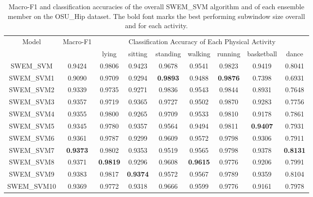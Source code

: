 \documentclass[letterpaper]{article}
\begin{document}
\begin{table*}[!htpb]
\small
\centering
\begin{tabular}{|c|c|c|c|c|c|c|c|c|}  \hline
\multicolumn{1}{|c|}{\multirow{2}{*}{Model}} & 
\multicolumn{1}{|c|}{\multirow{2}{*}{Macro-F1}} &
\multicolumn{7}{|c|}{Classification Accuracy of Each Physical Activity} \\ \cline{3-9}
         &       & lying      & sitting    & standing   & walking    & running    & basketball & dance \\ \hline
SWEM\_SVM & 0.9424   & 0.9806     & 0.9423     & 0.9678     & 0.9541     & 0.9823     & 0.9419     & 0.8041 \\ \hline
SWEM\_SVM1 & 0.9090   & 0.9709     & 0.9294     & {\bf 0.9893} & 0.9488     & {\bf 0.9876} & 0.7398     & 0.6931 \\ 
SWEM\_SVM2 & 0.9339   & 0.9735     & 0.9271     & 0.9836     & 0.9543     & 0.9844     & 0.8931     & 0.7648 \\ 
SWEM\_SVM3 & 0.9357   & 0.9719     & 0.9365     & 0.9727     & 0.9502     & 0.9870     & 0.9283     & 0.7756 \\ 
SWEM\_SVM4 & 0.9355   & 0.9800     & 0.9265     & 0.9709     & 0.9533     & 0.9810     & 0.9178     & 0.7861 \\ 
SWEM\_SVM5 & 0.9345   & 0.9780     & 0.9357     & 0.9564     & 0.9494     & 0.9811     & {\bf 0.9407} & 0.7931 \\ 
SWEM\_SVM6 & 0.9361   & 0.9787     & 0.9299     & 0.9609     & 0.9572     & 0.9798     & 0.9306     & 0.7911 \\ 
SWEM\_SVM7 & {\bf 0.9373}   & 0.9802     & 0.9353     & 0.9519     & 0.9565     & 0.9798     & 0.9378     & {\bf 0.8131} \\ 
SWEM\_SVM8 & 0.9371   & {\bf 0.9819} & 0.9296     & 0.9608     & {\bf 0.9615} & 0.9776     & 0.9206     & 0.7991 \\ 
SWEM\_SVM9 & 0.9383   & 0.9817     & {\bf 0.9374} & 0.9572     & 0.9567     & 0.9789     & 0.9359     & 0.8104 \\ 
SWEM\_SVM10 & 0.9369   & 0.9772     & 0.9318     & 0.9666     & 0.9599     & 0.9776     & 0.9161     & 0.7978 \\ \hline
\end{tabular}
\caption{Macro-F1 and classification accuracies of the overall SWEM\_SVM algorithm and of each ensemble member on the OSU\_Hip dataset. The bold font marks the best performing subwindow size overall and for each activity.}
\label{tbl:actacc_osu_hip_svm}
\end{table*}
\end{document}
